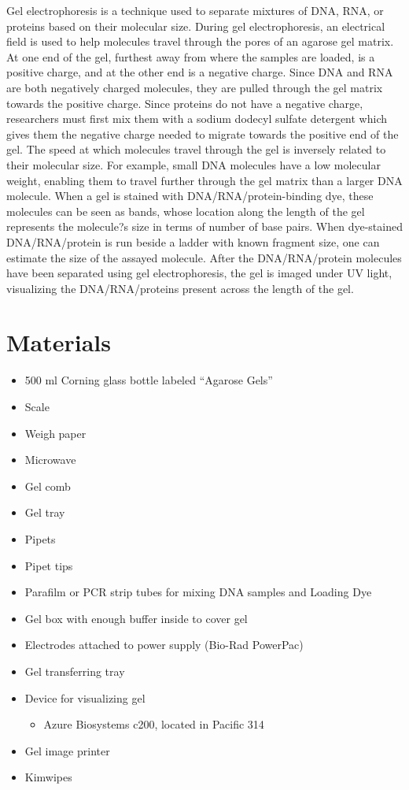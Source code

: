 \documentclass[
  letterpaper,
  DIV=11,
  numbers=noendperiod]{scrreprt}
\providecommand{\tightlist}{%
  \setlength{\itemsep}{0pt}\setlength{\parskip}{0pt}}\usepackage{longtable,booktabs,array}
\begin{document}
Gel electrophoresis is a technique used to separate mixtures of DNA,
RNA, or proteins based on their molecular size. During gel
electrophoresis, an electrical field is used to help molecules travel
through the pores of an agarose gel matrix. At one end of the gel,
furthest away from where the samples are loaded, is a positive charge,
and at the other end is a negative charge. Since DNA and RNA are both
negatively charged molecules, they are pulled through the gel matrix
towards the positive charge. Since proteins do not have a negative
charge, researchers must first mix them with a sodium dodecyl sulfate
detergent which gives them the negative charge needed to migrate towards
the positive end of the gel. The speed at which molecules travel through
the gel is inversely related to their molecular size. For example, small
DNA molecules have a low molecular weight, enabling them to travel
further through the gel matrix than a larger DNA molecule. When a gel is
stained with DNA/RNA/protein-binding dye, these molecules can be seen as
bands, whose location along the length of the gel represents the
molecule?s size in terms of number of base pairs. When dye-stained
DNA/RNA/protein is run beside a ladder with known fragment size, one can
estimate the size of the assayed molecule. After the DNA/RNA/protein
molecules have been separated using gel electrophoresis, the gel is
imaged under UV light, visualizing the DNA/RNA/proteins present across
the length of the gel.

\hypertarget{materials-22}{%
\section{Materials}\label{materials-22}}

\begin{itemize}
\tightlist
\item
  500 ml Corning glass bottle labeled ``Agarose Gels''
\item
  Scale
\item
  Weigh paper
\item
  Microwave
\item
  Gel comb
\item
  Gel tray
\item
  Pipets
\item
  Pipet tips
\item
  Parafilm or PCR strip tubes for mixing DNA samples and Loading Dye
\item
  Gel box with enough buffer inside to cover gel
\item
  Electrodes attached to power supply (Bio-Rad PowerPac)
\item
  Gel transferring tray
\item
  Device for visualizing gel

  \begin{itemize}
  \tightlist
  \item
    Azure Biosystems c200, located in Pacific 314
  \end{itemize}
\item
  Gel image printer
\item
  Kimwipes
\end{itemize}
\end{document}
